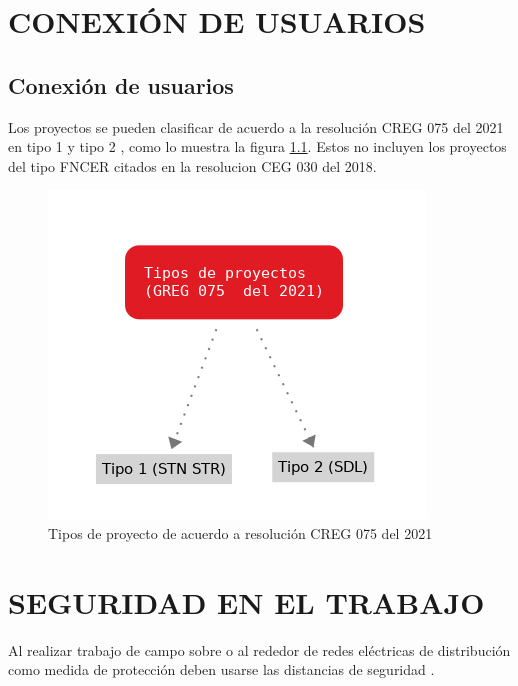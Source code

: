 \documentclass[a5paper]{book}%
\begin{document}
    
\chapter{CONEXIÓN DE USUARIOS}

\section{Conexión de usuarios}

Los proyectos se pueden clasificar de acuerdo a la resolución CREG 075
del 2021 en tipo 1 y tipo 2 , como lo muestra la figura
\ref{fig:tipoproyecto}. Estos no incluyen los proyectos del tipo
\ac{FNCER} citados en la resolucion CEG 030 del 2018.


\begin{figure}[H]
  \centering \includegraphics[width=1\linewidth]{tipoproyecto}
  \caption{Tipos de proyecto de acuerdo a resolución CREG 075 del
    2021}
  \label{fig:tipoproyecto}
\end{figure}


\chapter{SEGURIDAD EN EL TRABAJO}
Al realizar trabajo de campo sobre o al rededor de redes eléctricas de distribución como medida de protección deben usarse las distancias de seguridad \cite{RETIE2013}.\\\\
\end{document}
